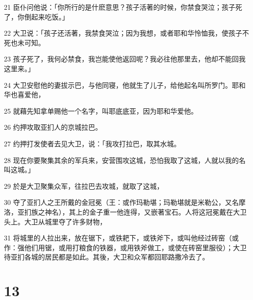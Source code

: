 \par 21 臣仆问他说：「你所行的是什麽意思？孩子活著的时候，你禁食哭泣；孩子死了，你倒起来吃饭。」
\par 22 大卫说：「孩子还活著，我禁食哭泣；因为我想，或者耶和华怜恤我，使孩子不死也未可知。
\par 23 孩子死了，我何必禁食，我岂能使他返回呢？我必往他那里去，他却不能回我这里来。」
\par 24 大卫安慰他的妻拔示巴，与他同寝，他就生了儿子，给他起名叫所罗门。耶和华也喜爱他，
\par 25 就藉先知拿单赐他一个名字，叫耶底底亚，因为耶和华爱他。
\par 26 约押攻取亚扪人的京城拉巴。
\par 27 约押打发使者去见大卫，说：「我攻打拉巴，取其水城。
\par 28 现在你要聚集其余的军兵来，安营围攻这城，恐怕我取了这城，人就以我的名叫这城。」
\par 29 於是大卫聚集众军，往拉巴去攻城，就取了这城，
\par 30 夺了亚扪人之王所戴的金冠冕（王：或作玛勒堪；玛勒堪就是米勒公，又名摩洛，亚扪族之神名），其上的金子重一他连得，又嵌著宝石。人将这冠冕戴在大卫头上。大卫从城里夺了许多财物，
\par 31 将城里的人拉出来，放在锯下，或铁耙下，或铁斧下，或叫他经过砖窑（或作：强他们用锯，或用打粮食的铁器，或用铁斧做工，或使在砖窑里服役）；大卫待亚扪各城的居民都是如此。其後，大卫和众军都回耶路撒冷去了。

\chapter{13}

